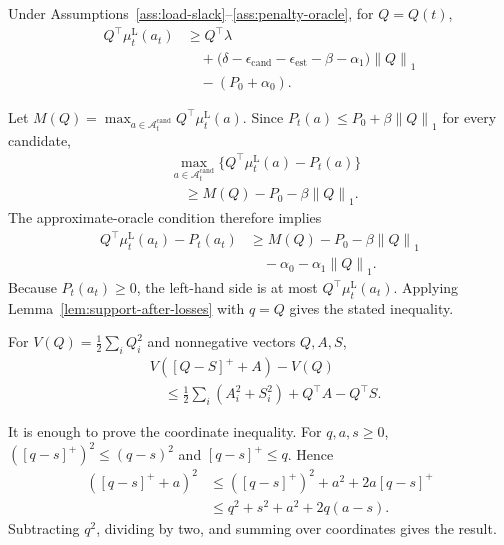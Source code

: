 \documentclass[opre,dblanonrev]{informs4}
\newcommand{\Acand}{\mathcal A^{\mathrm{cand}}}
\newcommand{\lowermu}{\mu^{\mathrm L}}
\newcommand{\normone}[1]{\left\|#1\right\|_1}
\begin{document}
\begin{lemma}
\label{lem:selected-margin}
Under Assumptions~\ref{ass:load-slack}--\ref{ass:penalty-oracle}, for
\(Q=Q(t)\),
\begin{equation}
  \begin{aligned}
  Q^\top\lowermu_t(a_t)
  &\ge Q^\top\lambda\\
  &\quad{}+
  \bigl(\delta-\epsilon_{\mathrm{cand}}
  -\epsilon_{\mathrm{est}}
  -\beta-\alpha_1\bigr)\normone{Q}\\
  &\quad{}-(P_0+\alpha_0).
  \end{aligned}
\end{equation}
\end{lemma}

Let \(M(Q)=\max_{a\in\Acand_t}Q^\top\lowermu_t(a)\).  Since
\(P_t(a)\le P_0+\beta\normone{Q}\) for every candidate,
\begin{equation}
  \begin{aligned}
  &\max_{a\in\Acand_t}
  \{Q^\top\lowermu_t(a)-P_t(a)\}\\
  &\quad{}\ge M(Q)-P_0-\beta\normone{Q}.
  \end{aligned}
\end{equation}
The approximate-oracle condition therefore implies
\begin{equation}
  \begin{aligned}
  Q^\top\lowermu_t(a_t)-P_t(a_t)
  &\ge M(Q)-P_0-\beta\normone{Q}\\
  &\quad{}-\alpha_0-\alpha_1\normone{Q}.
  \end{aligned}
\end{equation}
Because \(P_t(a_t)\ge0\), the left-hand side is at most
\(Q^\top\lowermu_t(a_t)\).  Applying
Lemma~\ref{lem:support-after-losses} with \(q=Q\) gives the stated inequality.
\endproof

\begin{lemma}
\label{lem:quadratic-step}
For \(V(Q)=\frac12\sum_iQ_i^2\) and nonnegative vectors \(Q,A,S\),
\begin{equation}
  \begin{aligned}
  &V([Q-S]^+ + A)-V(Q)\\
  &\quad\le
  \frac12\sum_i(A_i^2+S_i^2)
  +Q^\top A-Q^\top S.
  \end{aligned}
\end{equation}
\end{lemma}

It is enough to prove the coordinate inequality.  For \(q,a,s\ge0\),
\(([q-s]^+)^2\le(q-s)^2\) and \([q-s]^+\le q\).  Hence
\begin{equation}
  \begin{aligned}
  ([q-s]^++a)^2
  &\le ([q-s]^+)^2+a^2+2a[q-s]^+\\
  &\le q^2+s^2+a^2+2q(a-s).
  \end{aligned}
\end{equation}
Subtracting \(q^2\), dividing by two, and summing over coordinates gives the
result.
\endproof
\end{document}
